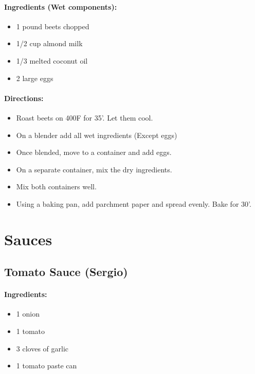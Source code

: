 \documentclass{article}
\begin{document}
\paragraph{Ingredients (Wet components):}
\begin{itemize}
	\item 1 pound beets chopped
	\item 1/2 cup almond milk
	\item 1/3 melted coconut oil
	\item 2 large eggs
\end{itemize}


\paragraph{Directions:}
\begin{itemize}
	\item Roast beets on 400F for 35'. Let them cool.
	\item On a blender add all wet ingredients (Except eggs)
	\item Once blended, move to a container and add eggs.
	\item On a separate container, mix the dry ingredients.
	\item Mix both containers well.
	\item Using a baking pan, add parchment paper and spread evenly. Bake for 30'.
\end{itemize}

\section{Sauces}

\subsection{Tomato Sauce (Sergio)}

\paragraph{Ingredients:}

\begin{itemize}
	\item 1 onion 
	\item 1 tomato 
	\item 3 cloves of garlic 
	\item 1 tomato paste can
\end{itemize}
\end{document}
